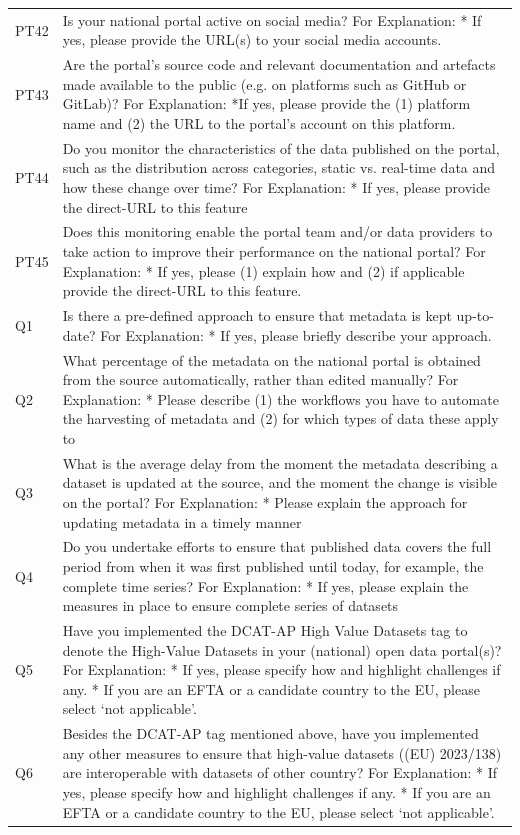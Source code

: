 {\begin{longtable}[]{@{}
  L{0.1386}
  L{0.8614}@{}}
PT42 & Is your national portal active on social media? For Explanation: * If yes, please provide the URL(s) to your social media accounts. \\
PT43 & Are the portal's source code and relevant documentation and artefacts made available to the public (e.g. on platforms such as GitHub or GitLab)? For Explanation: *If yes, please provide the (1) platform name and (2) the URL to the portal's account on this platform. \\
PT44 & Do you monitor the characteristics of the data published on the portal, such as the distribution across categories, static vs. real-time data and how these change over time? For Explanation: * If yes, please provide the direct-URL to this feature \\
PT45 & Does this monitoring enable the portal team and/or data providers to take action to improve their performance on the national portal? For Explanation: * If yes, please (1) explain how and (2) if applicable provide the direct-URL to this feature. \\
Q1 & Is there a pre-defined approach to ensure that metadata is kept up-to-date? For Explanation: * If yes, please briefly describe your approach. \\
Q2 & What percentage of the metadata on the national portal is obtained from the source automatically, rather than edited manually? For Explanation: * Please describe (1) the workflows you have to automate the harvesting of metadata and (2) for which types of data these apply to \\
Q3 & What is the average delay from the moment the metadata describing a dataset is updated at the source, and the moment the change is visible on the portal? For Explanation: * Please explain the approach for updating metadata in a timely manner \\
Q4 & Do you undertake efforts to ensure that published data covers the full period from when it was first published until today, for example, the complete time series? For Explanation: * If yes, please explain the measures in place to ensure complete series of datasets \\
Q5 & Have you implemented the DCAT-AP High Value Datasets tag to denote the High-Value Datasets in your (national) open data portal(s)? For Explanation: * If yes, please specify how and highlight challenges if any. * If you are an EFTA or a candidate country to the EU, please select `not applicable'. \\
Q6 & Besides the DCAT-AP tag mentioned above, have you implemented any other measures to ensure that high-value datasets ((EU) 2023/138) are interoperable with datasets of other country? For Explanation: * If yes, please specify how and highlight challenges if any. * If you are an EFTA or a candidate country to the EU, please select `not applicable'. \\

\end{longtable}}
